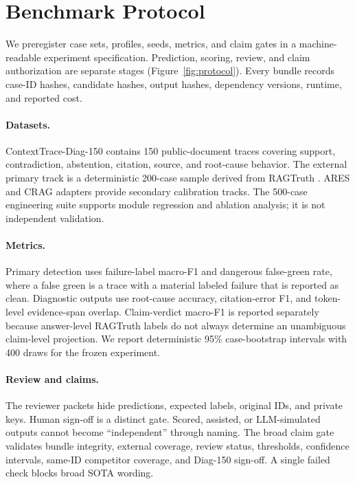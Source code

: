 \section{Benchmark Protocol}
We preregister case sets, profiles, seeds, metrics, and claim gates in a
machine-readable experiment specification. Prediction, scoring, review, and
claim authorization are separate stages (Figure~\ref{fig:protocol}). Every
bundle records case-ID hashes, candidate hashes, output hashes, dependency
versions, runtime, and reported cost.

\paragraph{Datasets.}
ContextTrace-Diag-150 contains 150 public-document traces covering support,
contradiction, abstention, citation, source, and root-cause behavior. The
external primary track is a deterministic 200-case sample derived from
RAGTruth \citep{niu2024ragtruth}. ARES and CRAG adapters provide secondary
calibration tracks. The 500-case engineering suite supports module regression
and ablation analysis; it is not independent validation.

\paragraph{Metrics.}
Primary detection uses failure-label macro-F1 and dangerous false-green rate,
where a false green is a trace with a material labeled failure that is reported
as clean. Diagnostic outputs use root-cause accuracy, citation-error F1, and
token-level evidence-span overlap. Claim-verdict macro-F1 is reported separately
because answer-level RAGTruth labels do not always determine an unambiguous
claim-level projection. We report deterministic 95\% case-bootstrap intervals
with 400 draws for the frozen experiment.

\paragraph{Review and claims.}
The reviewer packets hide predictions, expected labels, original IDs, and
private keys. Human sign-off is a distinct gate. Scored, assisted, or
LLM-simulated outputs cannot become ``independent'' through naming. The broad
claim gate validates bundle integrity, external coverage, review status,
thresholds, confidence intervals, same-ID competitor coverage, and Diag-150
sign-off. A single failed check blocks broad SOTA wording.


